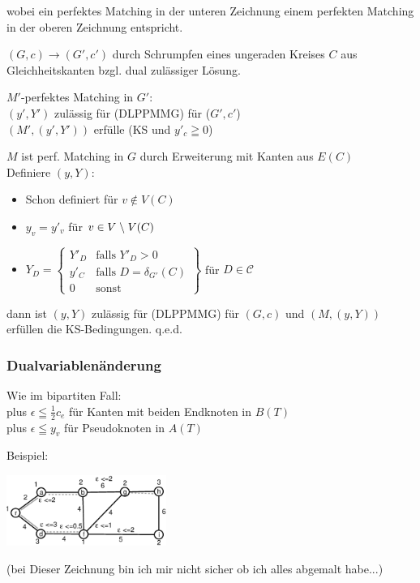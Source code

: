 wobei ein perfektes Matching in der unteren Zeichnung einem perfekten
Matching in der oberen Zeichnung entspricht.

\begin{lemma} \label{DualSchrGleich}
$(G,c) \rightarrow (G',c')$ durch Schrumpfen eines ungeraden Kreises $C$
aus Gleichheitskanten bzgl. dual zulässiger Lösung. 
\end{lemma}

$M'$-perfektes Matching in $G'$:\\
$(y',Y')$ zulässig für (DLPPMMG) für ($G',c'$)\\
$(M',(y',Y'))$ erfülle (KS und $y'_c \geqq 0$)

$M$ ist perf. Matching in $G$ durch Erweiterung mit Kanten aus $E(C)$\\
Definiere $(y,Y)$:
\begin{itemize}
\item Schon definiert für $v \notin V(C)$
\item $y_v = y'_v$ für $v \in V \;\backslash\; V(C)$
\item $Y_D = \left\{ \begin{array}{ll}Y'_D& \mbox{falls } Y'_D > 0\\
y'_C & \mbox{falls } D = \delta_{G'}(C)\\ 0&\mbox{sonst} \end{array}
\right\}$ für $D \in \mathscr{C}$
\end{itemize}

dann ist $(y,Y)$ zulässig für (DLPPMMG) für $(G,c)$ und $(M,(y,Y))$
erfüllen die KS-Bedingungen. q.e.d.

\subsubsection{Dualvariablenänderung}
Wie im bipartiten Fall:\\
plus $\epsilon \leqq  \frac{1}{2} c_e$ für Kanten mit beiden Endknoten in
$B(T)$\\
plus $\epsilon \leqq y_v$ für Pseudoknoten in $A(T)$

Beispiel:

\includegraphics[height=2.3cm]{bilder/5-3Dual} 

(bei Dieser Zeichnung bin ich mir nicht sicher ob ich alles abgemalt
habe...)

